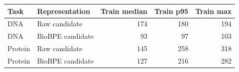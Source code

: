 \begin{tabular}{llrrr}
\toprule
Task & Representation & Train median & Train p95 & Train max \\
\midrule
DNA & Raw candidate & 174 & 180 & 194 \\
DNA & BioBPE candidate & 93 & 97 & 103 \\
Protein & Raw candidate & 145 & 258 & 318 \\
Protein & BioBPE candidate & 127 & 216 & 282 \\
\bottomrule
\end{tabular}
